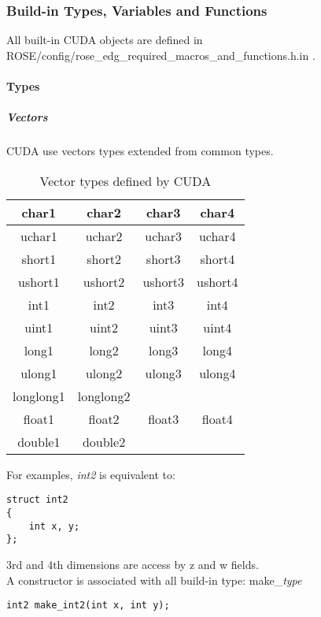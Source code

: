 			\subsubsection{Build-in Types, Variables and Functions}
			
All built-in CUDA objects are defined in ROSE/config/rose\_edg\_required\_macros\_and\_functions.h.in .
			
				\paragraph{Types}
			
					\subparagraph{Vectors}
					
CUDA use vectors types extended from common types.
\begin{table}[!h]
	\caption{Vector types defined by CUDA}
	\center
	\begin{tabular}{|c|c|c|c|} \hline
	char1 & char2 & char3 & char4 \\\hline
	uchar1 & uchar2 & uchar3 & uchar4 \\\hline
	short1 & short2 & short3 & short4 \\\hline
	ushort1 & ushort2 & ushort3 & ushort4 \\\hline
	int1 & int2 & int3 & int4 \\\hline
	uint1 & uint2 & uint3 & uint4 \\\hline
	long1 & long2 & long3 & long4 \\\hline
	ulong1 & ulong2 & ulong3 & ulong4 \\\hline
	longlong1 & longlong2 &  & \\\hline
	float1 & float2 & float3 & float4 \\\hline
	double1 & double2 &  & \\\hline
	\end{tabular}
	\label{heterogeneous:tabCudaVector}
\end{table}

For examples, \emph{int2} is equivalent to:
\begin{verbatim}struct int2
{
	int x, y;
};\end{verbatim}
3rd and 4th dimensions are access by z and w fields.\\

A constructor is associated with all build-in type: make\_\emph{type}
\begin{verbatim}int2 make_int2(int x, int y);\end{verbatim}\\
			
